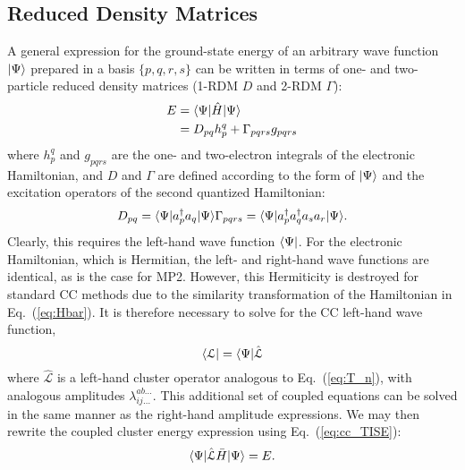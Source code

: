 \subsection{Reduced Density Matrices} \label{ss:rdm} A general expression
for the ground-state energy of an arbitrary wave function $| \Psi \rangle$
prepared in a basis $\{p,q,r,s\}$ can be written in terms of one- and
two-particle reduced density matrices (1-RDM $D$ and 2-RDM $\Gamma$):
\cite{Harris1992,Trucks1988}
\begin{equation} \label{eq:pdm_e}
    \begin{aligned} E & = \langle\Psi |\hat{H}| \Psi \rangle \\
      & = D_{pq}h_{p}^{q} + \Gamma_{pqrs}g_{pqrs}
    \end{aligned}
\end{equation} where $h_{p}^{q}$ and $g_{pqrs}$ are the one- and two-electron integrals of the
electronic Hamiltonian, and $D$ and $\Gamma$ are defined according to the
form of $| \Psi \rangle$ and the excitation operators of the second quantized
Hamiltonian: \begin{subequations} \begin{equation} \label{eq:opdm}
    D_{pq} = \bra{\Psi}a_p^{\dagger}a_q\ket{\Psi}
\end{equation} \begin{equation} \label{eq:tpdm}
    \Gamma_{pqrs} = \bra{\Psi}a_p^{\dagger}a_q^{\dagger}a_sa_r\ket{\Psi}.
\end{equation} \end{subequations} 
Clearly, this requires the
left-hand wave function $\langle\Psi |$. For the electronic Hamiltonian,
which is Hermitian, the left- and right-hand wave functions are identical,
as is the case for MP2. However, this Hermiticity is destroyed for standard
CC methods due to the similarity transformation of the Hamiltonian in
Eq.~(\ref{eq:Hbar}).\cite{Crawford2000} It is therefore necessary to solve for the CC left-hand
wave function, \begin{equation} \label{eq:cc_lwfn}
    \langle\mathcal{L} | = \langle\Psi |\hat{\mathcal{L}}
\end{equation} where $\hat{\mathcal{L}}$ is a left-hand cluster
operator analogous to Eq.~(\ref{eq:T_n}), with analogous amplitudes
$\lambda_{ij\ldots}^{ab\ldots}$. This additional set of coupled
equations can be solved in the same manner as the right-hand amplitude
expressions. We may then rewrite the coupled cluster energy expression
using Eq.~(\ref{eq:cc_TISE}): \begin{equation} \label{eq:cc_energy_total}
    \langle\Psi |\hat{\mathcal{L}}\bar{H}| \Psi \rangle = E.
\end{equation}

